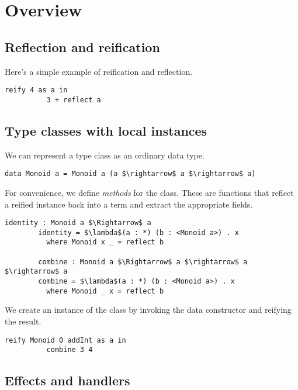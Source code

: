 \section{Overview}

  \subsection{Reflection and reification}

    Here's a simple example of reification and reflection.

    \noindent
    \begin{minipage}{\linewidth}
      \begin{lstlisting}[gobble=8, mathescape=true]
        reify 4 as a in
          3 + reflect a
      \end{lstlisting}
    \end{minipage}

  \subsection{Type classes with local instances}

    We can represent a type class as an ordinary data type.

    \noindent
    \begin{minipage}{\linewidth}
      \begin{lstlisting}[gobble=8, mathescape=true]
        data Monoid a = Monoid a (a $\rightarrow$ a $\rightarrow$ a)
      \end{lstlisting}
    \end{minipage}

    \noindent For convenience, we define \emph{methods} for the class. These are functions that reflect a reified instance back into a term and extract the appropriate fields.

    \noindent
    \begin{minipage}{\linewidth}
      \begin{lstlisting}[gobble=8, mathescape=true]
        identity : Monoid a $\Rightarrow$ a
        identity = $\lambda$(a : *) (b : <Monoid a>) . x
          where Monoid x _ = reflect b

        combine : Monoid a $\Rightarrow$ a $\rightarrow$ a $\rightarrow$ a
        combine = $\lambda$(a : *) (b : <Monoid a>) . x
          where Monoid _ x = reflect b
      \end{lstlisting}
    \end{minipage}

    \noindent We create an instance of the class by invoking the data constructor and reifying the result.

    \noindent
    \begin{minipage}{\linewidth}
      \begin{lstlisting}[gobble=8, mathescape=true]
        reify Monoid 0 addInt as a in
          combine 3 4
      \end{lstlisting}
    \end{minipage}

  \subsection{Effects and handlers}
